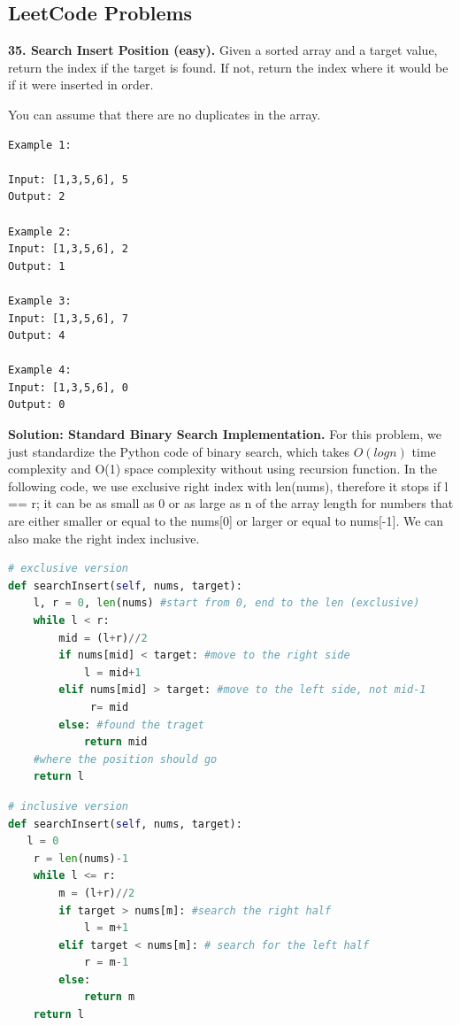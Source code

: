 \documentclass[../searching.tex]{subfiles}
\begin{document}
\subsection{LeetCode Problems}
\begin{examples}
\item \textbf{35. Search Insert Position (easy).} Given a sorted array and a target value, return the index if the target is found. If not, return the index where it would be if it were inserted in order.

You can assume that there are no duplicates in the array.
\begin{lstlisting}[numbers=none]
Example 1:

Input: [1,3,5,6], 5
Output: 2

Example 2:
Input: [1,3,5,6], 2
Output: 1

Example 3:
Input: [1,3,5,6], 7
Output: 4

Example 4:
Input: [1,3,5,6], 0
Output: 0
\end{lstlisting}

\textbf{Solution: Standard Binary Search Implementation.} For this problem, we just standardize the Python code of binary search, which takes $O(logn)$ time complexity and O(1) space complexity without using recursion function. In the following code, we use exclusive right index with len(nums), therefore it stops if l == r; it can be as small as 0 or as large as n of the array length for numbers that are either smaller or equal to the nums[0] or larger or equal to nums[-1]. We can also make the right index inclusive. 
\begin{lstlisting}[language = Python]
# exclusive version
def searchInsert(self, nums, target):
    l, r = 0, len(nums) #start from 0, end to the len (exclusive)
    while l < r:
        mid = (l+r)//2
        if nums[mid] < target: #move to the right side
            l = mid+1
        elif nums[mid] > target: #move to the left side, not mid-1
             r= mid
        else: #found the traget
            return mid
    #where the position should go
    return l
\end{lstlisting}

\begin{lstlisting}[language = Python]
# inclusive version
def searchInsert(self, nums, target):
   l = 0
    r = len(nums)-1
    while l <= r:
        m = (l+r)//2
        if target > nums[m]: #search the right half
            l = m+1
        elif target < nums[m]: # search for the left half
            r = m-1
        else:
            return m
    return l
\end{lstlisting}
\end{examples}
\end{document}
